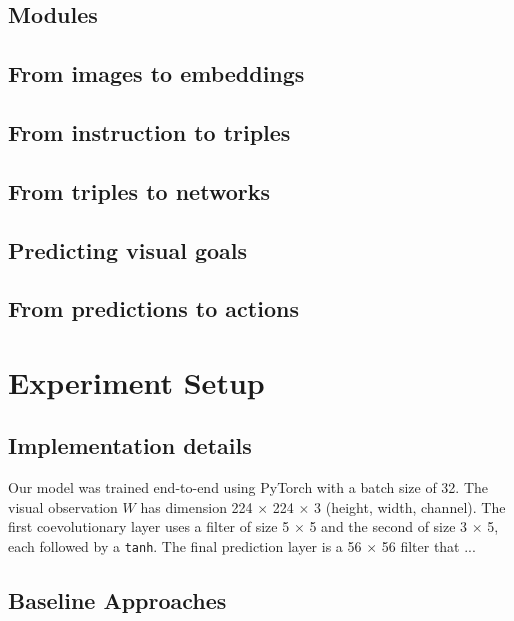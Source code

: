 \documentclass[conference]{IEEEtran}
\newenvironment{towrite}%
  {\begin{mdframed}[backgroundcolor=lightgray,
  					topline=false,
  					rightline=false,
  					leftline=false,
  					bottomline=false
  					]\smallskip}%
  {\smallskip\end{mdframed}}
\begin{document}
\begin{towrite}
\subsection{Modules}

\subsection{From images to embeddings}

\subsection{From instruction to triples}

\subsection{From triples to networks}

\subsection{Predicting visual goals}

\subsection{From predictions to actions}

\section{Experiment Setup}

\subsection{Implementation details}

Our model was trained end-to-end using PyTorch with a batch size of 32. The visual observation $W$ has dimension 224 $\times$ 224 $\times$ 3 (height, width, channel). The first coevolutionary layer uses a filter of size 5 $\times$ 5 and the second of size 3 $\times$ 5, each followed by a \texttt{tanh}. The final prediction layer is a 56 $\times$ 56 filter that ...

\subsection{Baseline Approaches}


\end{towrite}
\end{document}

